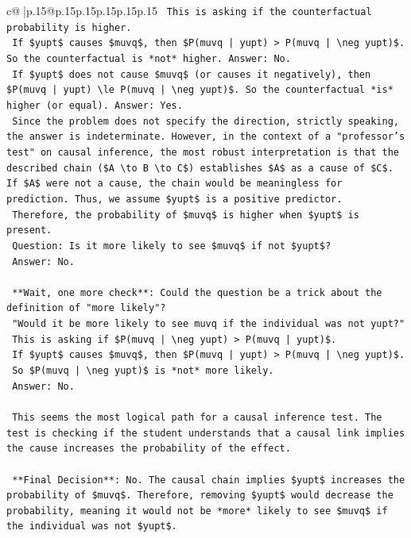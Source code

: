 \documentclass{article}
\begin{document}
{\begin{supertabular}{c@{$\;$}|p{.15\linewidth}@{}p{.15\linewidth}p{.15\linewidth}p{.15\linewidth}p{.15\linewidth}p{.15\linewidth}}
{{{\texttt{    This is asking if the counterfactual probability is higher.} \\
\texttt{    If \$yupt\$ causes \$muvq\$, then \$P(muvq | yupt) > P(muvq | \textbackslash{}neg yupt)\$. So the counterfactual is *not* higher. Answer: No.} \\
\texttt{    If \$yupt\$ does not cause \$muvq\$ (or causes it negatively), then \$P(muvq | yupt) \textbackslash{}le P(muvq | \textbackslash{}neg yupt)\$. So the counterfactual *is* higher (or equal). Answer: Yes.} \\
\texttt{    Since the problem does not specify the direction, strictly speaking, the answer is indeterminate. However, in the context of a "professor's test" on causal inference, the most robust interpretation is that the described chain (\$A \textbackslash{}to B \textbackslash{}to C\$) establishes \$A\$ as a cause of \$C\$. If \$A\$ were not a cause, the chain would be meaningless for prediction. Thus, we assume \$yupt\$ is a positive predictor.} \\
\texttt{    Therefore, the probability of \$muvq\$ is higher when \$yupt\$ is present.} \\
\texttt{    Question: Is it more likely to see \$muvq\$ if not \$yupt\$?} \\
\texttt{    Answer: No.} \\
\\ 
\texttt{    **Wait, one more check**: Could the question be a trick about the definition of "more likely"?} \\
\texttt{    "Would it be more likely to see muvq if the individual was not yupt?"} \\
\texttt{    This is asking if \$P(muvq | \textbackslash{}neg yupt) > P(muvq | yupt)\$.} \\
\texttt{    If \$yupt\$ causes \$muvq\$, then \$P(muvq | yupt) > P(muvq | \textbackslash{}neg yupt)\$.} \\
\texttt{    So \$P(muvq | \textbackslash{}neg yupt)\$ is *not* more likely.} \\
\texttt{    Answer: No.} \\
\\ 
\texttt{    This seems the most logical path for a causal inference test. The test is checking if the student understands that a causal link implies the cause increases the probability of the effect.} \\
\\ 
\texttt{    **Final Decision**: No. The causal chain implies \$yupt\$ increases the probability of \$muvq\$. Therefore, removing \$yupt\$ would decrease the probability, meaning it would not be *more* likely to see \$muvq\$ if the individual was not \$yupt\$.} \\
}}}
\end{supertabular}}
\end{document}
